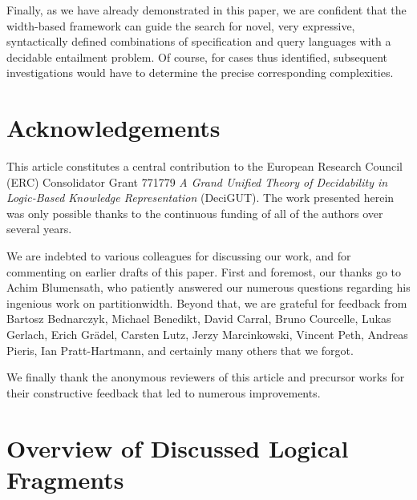 Finally, as we have already demonstrated in this paper, we are confident that the width-based framework can guide the search for novel, very expressive, syntactically defined combinations of specification and query languages with a decidable entailment problem. Of course, for cases thus identified, subsequent investigations would have to determine the precise corresponding complexities.  




\section*{Acknowledgements}

This article constitutes a central contribution to the European Research Council (ERC) Consolidator Grant 771779 \emph{A Grand Unified Theory of Decidability in Logic-Based Knowledge Representation} (DeciGUT).
The work presented herein was only possible thanks to the continuous funding of all of the authors over several years.

We are indebted to various colleagues for discussing our work, and for commenting on earlier drafts of this paper. First and foremost, our thanks go to Achim Blumensath, who patiently answered our numerous questions regarding his ingenious work on partitionwidth.
Beyond that, we are grateful for feedback from Bartosz Bednarczyk, Michael Benedikt, David Carral, Bruno Courcelle, Lukas Gerlach, Erich Grädel, Carsten Lutz, Jerzy Marcinkowski, Vincent Peth, Andreas Pieris, Ian Pratt-Hartmann, and certainly many others that we forgot. 

We finally thank the anonymous reviewers of this article and precursor works for their constructive feedback that led to numerous improvements.


\clearpage




\clearpage

\appendix

\section{Overview of Discussed Logical Fragments}\label{app:logicoverview}
